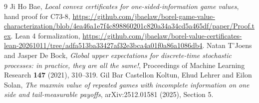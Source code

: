 \documentclass[11pt]{article}
\theoremstyle{definition}
\begin{document}
\begin{thebibliography}{9}
 Ji Ho Bae, \emph{Local convex certificates for one-sided-information game values}, hand proof for C73-8, \url{https://github.com/jbaelaw/borel-game-value-characterization/blob/4ea46a1e7f4c898860201c820a34a34cd5a465df/paper/Proof.tex}.
 Lean 4 formalization, \url{https://github.com/jbaelaw/borel-value-certificates-lean-20261011/tree/adfa513ba33427af32e3bca4a01f0a86a1086db4}.
 Natan T'Joens and Jasper De Bock, \emph{Global upper expectations for discrete-time stochastic processes: in practice, they are all the same!}, Proceedings of Machine Learning Research \textbf{147} (2021), 310--319.
 Gil Bar Castellon Koltun, Ehud Lehrer and Eilon Solan, \emph{The maxmin value of repeated games with incomplete information on one side and tail-measurable payoffs}, arXiv:2512.01581 (2025), Section 5.
\end{thebibliography}
\end{document}
